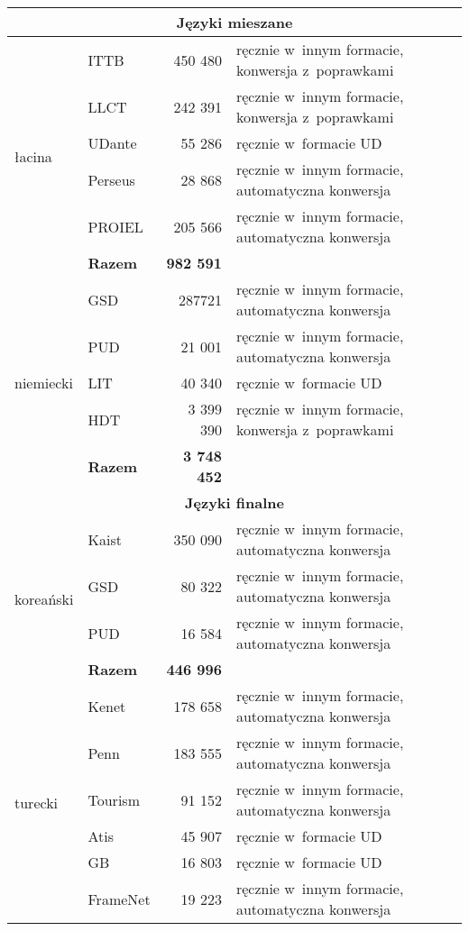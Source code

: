 \begin{table}[!h]
\begin{tabular}{llrl}
    \midrule   		
    		\multicolumn{4}{c}{\textbf{Języki mieszane}} \\
    \midrule
        \multirow{6}{*}{łacina} & ITTB & 450 480 & ręcznie w~innym formacie, konwersja z~poprawkami \\
        ~ & LLCT & 242 391 & ręcznie w~innym formacie, konwersja z~poprawkami \\
        ~ & UDante & 55 286 & ręcznie w~formacie UD \\
        ~ & Perseus & 28 868 & ręcznie w~innym formacie, automatyczna konwersja \\
        ~ & PROIEL & 205 566 & ręcznie w~innym formacie, automatyczna konwersja \\ 
        ~ & \textbf{Razem} & \textbf{982 591} \\ \midrule
        \multirow{5}{*}{niemiecki} & GSD & 287721 & ręcznie w~innym formacie, automatyczna konwersja \\
        ~ & PUD & 21 001 & ręcznie w~innym formacie, automatyczna konwersja \\
        ~ & LIT & 40 340 & ręcznie w~formacie UD \\
        ~ & HDT & 3 399 390 & ręcznie w~innym formacie, konwersja z~poprawkami \\ 
        ~ & \textbf{Razem} & \textbf{3 748 452} \\
    \midrule
    		\multicolumn{4}{c}{\textbf{Języki finalne}} \\
    \midrule
        \multirow{4}{*}{koreański} & Kaist & 350 090 & ręcznie w~innym formacie, automatyczna konwersja \\
        ~ & GSD & 80 322 & ręcznie w~innym formacie, automatyczna konwersja \\
        ~ & PUD & 16 584 & ręcznie w~innym formacie, automatyczna konwersja \\ 
        ~ & \textbf{Razem} & \textbf{446 996} \\ \midrule
        \multirow{9}{*}{turecki} & Kenet & 178 658 & ręcznie w~innym formacie, automatyczna konwersja \\
        ~ & Penn & 183 555 & ręcznie w~innym formacie, automatyczna konwersja \\
        ~ & Tourism & 91 152 & ręcznie w~innym formacie, automatyczna konwersja \\
        ~ & Atis & 45 907 & ręcznie w~formacie UD \\
        ~ & GB & 16 803 & ręcznie w~formacie UD \\
        ~ & FrameNet & 19 223 & ręcznie w~innym formacie, automatyczna konwersja \\

\end{tabular}
\end{table}
